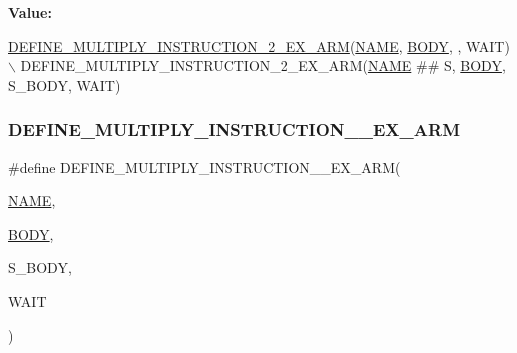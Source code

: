 {\bfseries Value\+:}
\begin{DoxyCode}
\mbox{\hyperlink{isa-arm_8c_a82c659ad9e9c43c6085ab387d3b0fa72}{DEFINE\_MULTIPLY\_INSTRUCTION\_2\_EX\_ARM}}(\mbox{\hyperlink{inflate_8h_a164ea0159d5f0b5f12a646f25f99eceaa67bc2ced260a8e43805d2480a785d312}{NAME}}, 
      \mbox{\hyperlink{gzlog_8c_aa6bdf6a6d9916c343e1e17774d84a156}{BODY}}, , WAIT) \(\backslash\)
    DEFINE\_MULTIPLY\_INSTRUCTION\_2\_EX\_ARM(\mbox{\hyperlink{inflate_8h_a164ea0159d5f0b5f12a646f25f99eceaa67bc2ced260a8e43805d2480a785d312}{NAME}} ## S, \mbox{\hyperlink{gzlog_8c_aa6bdf6a6d9916c343e1e17774d84a156}{BODY}}, S\_BODY, WAIT)
\end{DoxyCode}
\mbox{\label{isa-arm_8c_a82c659ad9e9c43c6085ab387d3b0fa72}} 
\subsubsection{\texorpdfstring{D\+E\+F\+I\+N\+E\+\_\+\+M\+U\+L\+T\+I\+P\+L\+Y\+\_\+\+I\+N\+S\+T\+R\+U\+C\+T\+I\+O\+N\+\_\+\_\+\+E\+X\+\_\+\+A\+RM}{DEFINE\_MULTIPLY\_INSTRUCTION\_2\_EX\_ARM}}
{\footnotesize\ttfamily \#define D\+E\+F\+I\+N\+E\+\_\+\+M\+U\+L\+T\+I\+P\+L\+Y\+\_\+\+I\+N\+S\+T\+R\+U\+C\+T\+I\+O\+N\+\_\+\_\+\+E\+X\+\_\+\+A\+RM(\begin{DoxyParamCaption}\item[{}]{\mbox{\hyperlink{inflate_8h_a164ea0159d5f0b5f12a646f25f99eceaa67bc2ced260a8e43805d2480a785d312}{N\+A\+ME}},  }\item[{}]{\mbox{\hyperlink{gzlog_8c_aa6bdf6a6d9916c343e1e17774d84a156}{B\+O\+DY}},  }\item[{}]{S\+\_\+\+B\+O\+DY,  }\item[{}]{W\+A\+IT }\end{DoxyParamCaption})}

